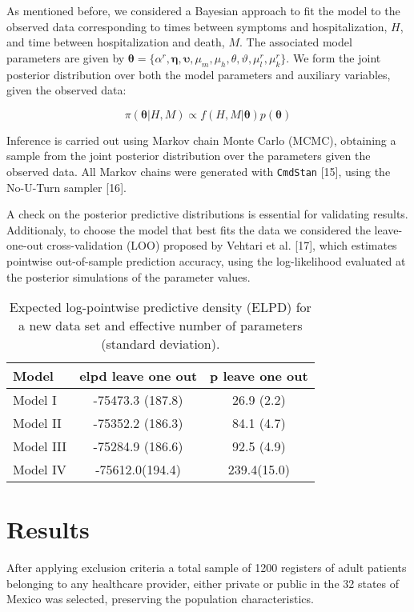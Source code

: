 \documentclass[10pt,letterpaper]{article}
\begin{document}
As mentioned before, we considered a Bayesian approach to fit the model
to the observed data corresponding to times between symptoms and
hospitalization, \(H\), and time between hospitalization and death,
\(M\). The associated model parameters are given by
\(\bm{\theta}=\{\alpha^r,\mathbf{\eta},\mathbf{\upsilon},\mu_m,\mu_h,\theta,\vartheta,\mu^r_l,\mu^r_k\}\).
We form the joint posterior distribution over both the model parameters
and auxiliary variables, given the observed data:

\[
\pi(\bm{\theta}|H,M)\propto f(H,M|\bm{\theta})p(\bm{\theta})
\]

Inference is carried out using Markov chain Monte Carlo (MCMC),
obtaining a sample from the joint posterior distribution over the
parameters given the observed data. All Markov chains were generated
with \texttt{CmdStan} {[}15{]}, using the No-U-Turn sampler {[}16{]}.

A check on the posterior predictive distributions is essential for
validating results. Additionaly, to choose the model that best fits the
data we considered the leave-one-out cross-validation (LOO) proposed by
Vehtari et al. {[}17{]}, which estimates pointwise out-of-sample
prediction accuracy, using the log-likelihood evaluated at the posterior
simulations of the parameter values.

\begin{table}[!htb]
\centering
\begin{tabular}{lcc}
\hline
{\textbf{Model}} & {\textbf{elpd leave one out}} & {\textbf{p leave one out}} \\
\hline Model I  &  -75473.3 (187.8) & 26.9 (2.2) \\
Model II          &   -75352.2 (186.3) &  84.1 (4.7)\\
Model III         &    -75284.9 (186.6) &  92.5 (4.9)  \\
Model IV & -75612.0(194.4) & 239.4(15.0) \\
\hline
\end{tabular}
\caption{\label{tab:gof} Expected log-pointwise predictive density (ELPD) for a new data set and effective number of parameters (standard deviation).}
\end{table}

\hypertarget{results}{%
\section{Results}\label{results}}

After applying exclusion criteria a total sample of 1200 registers of
adult patients belonging to any healthcare provider, either private or
public in the 32 states of Mexico was selected, preserving the
population characteristics.
\end{document}
